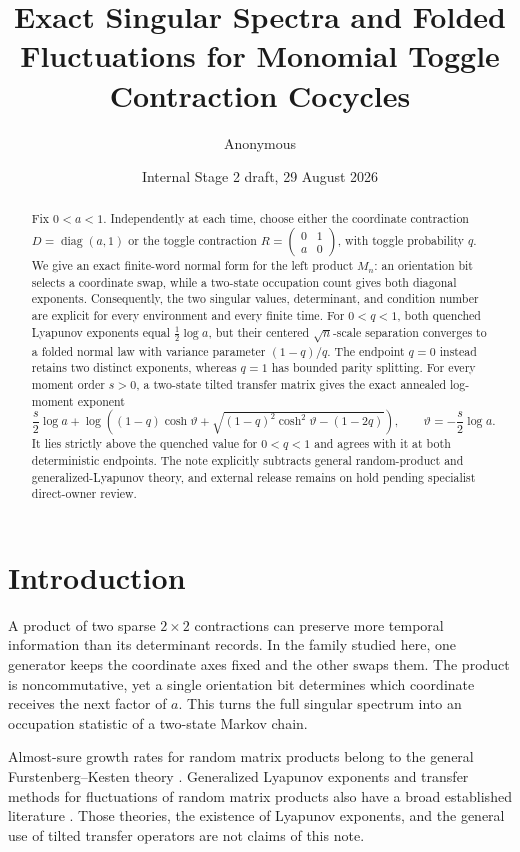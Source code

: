 \documentclass[11pt,a4paper]{amsart}
\title[Monomial toggle contraction cocycles]{Exact Singular Spectra and Folded Fluctuations for Monomial Toggle Contraction Cocycles}
\author{Anonymous}
\date{Internal Stage 2 draft, 29 August 2026}
\theoremstyle{definition}
\theoremstyle{remark}
\newcommand{\diag}{\operatorname{diag}}
\begin{document}
\begin{abstract}
Fix $0<a<1$.  Independently at each time, choose either the coordinate
contraction $D=\diag(a,1)$ or the toggle contraction
$R=\left(\begin{smallmatrix}0&1\\a&0\end{smallmatrix}\right)$, with toggle
probability $q$.  We give an exact finite-word normal form for the left
product $M_n$: an orientation bit selects a coordinate swap, while a
two-state occupation count gives both diagonal exponents.  Consequently,
the two singular values, determinant, and condition number are explicit
for every environment and every finite time.  For $0<q<1$, both quenched
Lyapunov exponents equal $\frac12\log a$, but their centered
$\sqrt n$-scale separation converges to a folded normal law with variance
parameter $(1-q)/q$.  The endpoint $q=0$ instead retains two distinct
exponents, whereas $q=1$ has bounded parity splitting.  For every moment
order $s>0$, a two-state tilted transfer matrix gives the exact annealed
log-moment exponent
\[
 \frac{s}{2}\log a+
 \log\!\left((1-q)\cosh\vartheta+
 \sqrt{(1-q)^2\cosh^2\vartheta-(1-2q)}\right),
 \qquad \vartheta=-\frac{s}{2}\log a.
\]
It lies strictly above the quenched value for $0<q<1$ and agrees with it
at both deterministic endpoints.  The note explicitly subtracts general
random-product and generalized-Lyapunov theory, and external release
remains on hold pending specialist direct-owner review.
\end{abstract}

\maketitle

\section{Introduction}

A product of two sparse $2\times2$ contractions can preserve more temporal
information than its determinant records.  In the family studied here,
one generator keeps the coordinate axes fixed and the other swaps them.
The product is noncommutative, yet a single orientation bit determines
which coordinate receives the next factor of $a$.  This turns the full
singular spectrum into an occupation statistic of a two-state Markov
chain.

Almost-sure growth rates for random matrix products belong to the general
Furstenberg--Kesten theory \cite{FurstenbergKesten1960}.  Generalized
Lyapunov exponents and transfer methods for fluctuations of random matrix
products also have a broad established literature
\cite{Texier2020}.  Those theories, the existence of Lyapunov exponents,
and the general use of tilted transfer operators are not claims of this
note.
\end{document}

